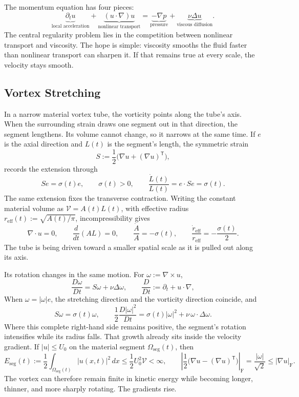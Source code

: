 
The momentum equation has four pieces:
\[
  \underbrace{\partial_t u}_{\text{local acceleration}}
  +
  \underbrace{(u\cdot\nabla)u}_{\text{nonlinear transport}}
  =
  \underbrace{-\nabla p}_{\text{pressure}}
  +
  \underbrace{\nu\Delta u}_{\text{viscous diffusion}}.
\]
The central regularity problem lies in the competition between nonlinear transport and viscosity.
The hope is simple: viscosity smooths the fluid faster than nonlinear transport can sharpen it.
If that remains true at every scale, the velocity stays smooth.

\subsection{Vortex Stretching}\label{sub:ThePerfectlyStretchingVortex}

In a narrow material vortex tube, the vorticity points along the tube's axis.
When the surrounding strain draws one segment out in that direction, the segment lengthens.
Its volume cannot change, so it narrows at the same time.
If \(e\) is the axial direction and \(L(t)\) is the segment's length, the symmetric strain
\[
  S:=\frac12\bigl(\nabla u+(\nabla u)^{\mathsf T}\bigr),
\]
records the extension through
\[
  Se=\sigma(t)e,
  \qquad
  \sigma(t)>0,
  \qquad
  \frac{\dot L(t)}{L(t)}
  =
  e\cdot Se
  =
  \sigma(t).
\]
The same extension fixes the transverse contraction.
Writing the constant material volume as \(\mathcal V=A(t)L(t)\), with effective radius \(r_{\mathrm{eff}}(t):=\sqrt{A(t)/\pi}\), incompressibility gives
\[
  \nabla\cdot u=0,
  \qquad
  \frac{d}{dt}(A L)=0,
  \qquad
  \frac{\dot A}{A}=-\sigma(t),
  \qquad
  \frac{\dot r_{\mathrm{eff}}}{r_{\mathrm{eff}}}
  =
  -\frac{\sigma(t)}{2}.
\]
The tube is being driven toward a smaller spatial scale as it is pulled out along its axis.

Its rotation changes in the same motion.
For \(\omega:=\nabla\times u\),
\[
  \frac{D\omega}{Dt}
  =
  S\omega+\nu\Delta\omega,
  \qquad
  \frac{D}{Dt}
  :=
  \partial_t+u\cdot\nabla,
\]
When \(\omega=|\omega|e\), the stretching direction and the vorticity direction coincide, and
\[
  S\omega
  =
  \sigma(t)\omega,
  \qquad
  \frac12\frac{D|\omega|^2}{Dt}
  =
  \sigma(t)|\omega|^2
  +
  \nu\,\omega\cdot\Delta\omega.
\]
Where this complete right-hand side remains positive, the segment's rotation intensifies while its radius falls.
That growth already sits inside the velocity gradient.
If \(|u|\leq U_0\) on the material segment \(\Omega_{\mathrm{seg}}(t)\), then
\[
  E_{\mathrm{seg}}(t)
  :=
  \frac12\int_{\Omega_{\mathrm{seg}}(t)}|u(x,t)|^2\,dx
  \leq
  \frac12U_0^2\mathcal V
  <
  \infty,
  \qquad
  \left|\frac12\bigl(\nabla u-(\nabla u)^{\mathsf T}\bigr)\right|_{\mathrm F}
  =
  \frac{|\omega|}{\sqrt2}
  \leq
  |\nabla u|_{\mathrm F}.
\]
The vortex can therefore remain finite in kinetic energy while becoming longer, thinner, and more sharply rotating.
The gradients rise.

